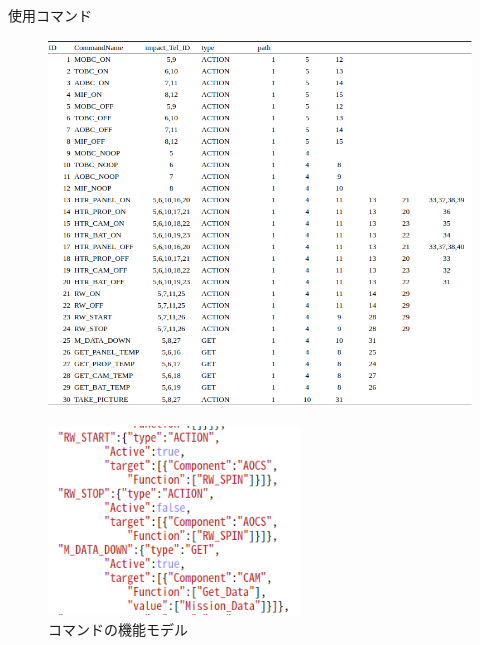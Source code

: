 \documentclass[11pt]{jsreport}
\begin{document}
\newpage
\begin{table}[H]
   \centering
   \caption{使用コマンド}
   \label{tab:command}
\end{table}
\vspace{-2zh}
\begin{figure}[H]
   \centering
      \includegraphics[width=16.5cm]{figure/COM.png}
\end{figure}

\begin{figure}[H]
   \centering
      \includegraphics[height=5.0cm]{figure/COM_type.png}
      \caption{コマンドの機能モデル}
      \label{fig:COM_type}
\end{figure}
\end{document}
